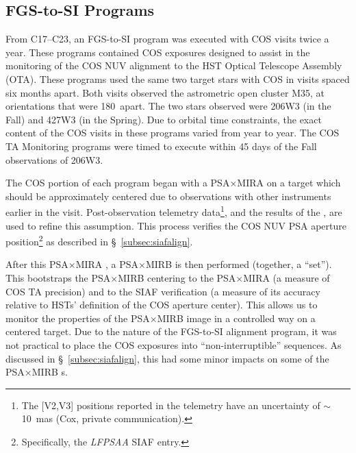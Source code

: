 \subsection{FGS-to-SI Programs}\label{subsec:fgs2si}
From C17--C23, an FGS-to-SI program was executed with COS visits twice a year. These programs contained COS exposures designed to assist in the monitoring of the COS NUV alignment to the HST Optical Telescope Assembly (OTA).
These programs used the same two target stars with COS in visits spaced six months apart. Both visits observed the astrometric open cluster M35, at orientations that were 180\degree~apart.
The two stars observed were 206W3 (in the Fall) and 427W3 (in the Spring). Due to orbital time constraints, the exact content of the COS visits in these programs varied from year to year.
The COS TA Monitoring programs were timed to execute within 45 days of the Fall observations of 206W3.

The COS portion of each program began with a PSA$\times$MIRA  on a target which should be approximately centered due to observations with other instruments earlier in the visit.
Post-observation telemetry data\footnote{The [V2,V3] positions reported in the telemetry have an uncertainty of $\sim$ 10~mas (Cox, private communication).}, and the results of the , are used to refine this assumption.
This process verifies the COS NUV PSA aperture position\footnote{Specifically, the \textit{LFPSAA} SIAF entry.} as described in \S~\ref{subsec:siafalign}.

After this PSA$\times$MIRA , a PSA$\times$MIRB  is then performed (together, a ``set'').
This bootstraps the PSA$\times$MIRB centering to the PSA$\times$MIRA (a measure of COS TA precision) and to the SIAF verification (a measure of its accuracy relative to HSTs' definition of the COS aperture center).
This allows us to monitor the properties of the PSA$\times$MIRB image in a controlled way on a centered target.
Due to the nature of the FGS-to-SI alignment program, it was not practical to place the COS exposures into ``non-interruptible'' sequences.
As discussed in \S~\ref{subsec:siafalign}, this had some minor impacts on some of the PSA$\times$MIRB s.


